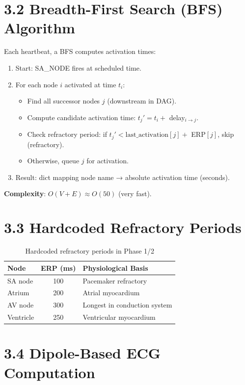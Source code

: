 \documentclass[12pt,oneside,a4paper]{book}
\begin{document}
\section{3.2 Breadth-First Search (BFS) Algorithm}

Each heartbeat, a BFS computes activation times:

\begin{enumerate}
  \item Start: SA\_NODE fires at scheduled time.
  \item For each node $i$ activated at time $t_i$:
    \begin{itemize}
      \item Find all successor nodes $j$ (downstream in DAG).
      \item Compute candidate activation time: $t_j' = t_i +$ delay$_{i \to j}$.
      \item Check refractory period: if $t_j' < \text{last\_activation}[j] +$ ERP$[j]$, skip (refractory).
      \item Otherwise, queue $j$ for activation.
    \end{itemize}
  \item Result: dict mapping node name → absolute activation time (seconds).
\end{enumerate}

\textbf{Complexity}: $O(V + E) \approx O(50)$ (very fast).

\section{3.3 Hardcoded Refractory Periods}

\begin{table}[H]
\centering
\begin{tabularx}{\textwidth}{|l|c|X|}
\hline
\textbf{Node} & \textbf{ERP (ms)} & \textbf{Physiological Basis} \\
\hline
SA node & 100 & Pacemaker refractory \\
Atrium & 200 & Atrial myocardium \\
AV node & 300 & Longest in conduction system \\
Ventricle & 250 & Ventricular myocardium \\
\hline
\end{tabularx}
\caption{Hardcoded refractory periods in Phase 1/2}
\label{tab:erp_hardcoded}
\end{table}

\section{3.4 Dipole-Based ECG Computation}
\end{document}
